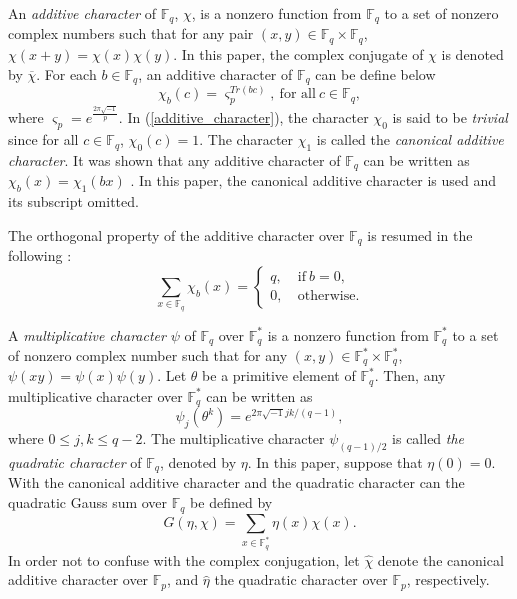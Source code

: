 \documentclass[final,1p,times]{elsarticle}
\begin{document}
   An \textit{additive character} of $ \mathbb{F}_{q} $, $ \chi $, is a nonzero function from $ \mathbb{F}_{q} $ to a set of nonzero complex numbers such that for any pair $ (x,y) \in \mathbb{F}_{q}\times \mathbb{F}_{q} $, $ \chi (x+y) =\chi(x)\chi(y)$. In this paper, the complex conjugate of $ \chi $ is denoted by $\overline{\chi} $. For each $ b\in \mathbb{F}_{q}$, an additive character of  $ \mathbb{F}_{q} $ can be define below
   \begin{equation}\label{additive_character}
   \chi_{b}(c)=\varsigma_{p}^{Tr(bc)},\ \text{for all}\ c\in \mathbb{F}_{q},
   \end{equation}
   where $ \varsigma_{p}=e^{\frac{2\pi\sqrt{-1}}{p}} $. In (\ref{additive_character}),  the  character $ \chi_{0} $ is said to be \textit{trivial} since for all $  c\in \mathbb{F}_{q} $, $ \chi_{0}(c) =1$. The character $ \chi_{1} $ is called the \textit{canonical additive character}. It was shown that  any additive character of 
  $ \mathbb{F}_{q} $ can be written as $ \chi_{b}(x)=\chi_{1}(bx) $ \cite[Chapter 5]{Bib15}. In this paper, the canonical additive character is used and its subscript omitted.
  
   The orthogonal property of the additive character over $ \mathbb{F}_{q} $ is resumed in the following \cite[Chapter 5]{Bib15}:
  \begin{equation*}
  \sum_{x\in \mathbb{F}_{q}}\chi_{b}(x)=
  \begin{cases}
  q,&\ \text{if}\ b=0,\\
  0,&\ \text{otherwise.}
  \end{cases}
  \end{equation*}
  
  A \textit{multiplicative character} $ \psi $ of $ \mathbb{F}_{q} $ over $ \mathbb{F}_{q}^{*} $ is a nonzero function from $ \mathbb{F}_{q}^{*} $ to  a set of nonzero complex number such that for any $ (x,y)\in \mathbb{F}_{q}^{*}\times\mathbb{F}_{q}^{*}$,  $ \psi(xy)=\psi(x)\psi(y) $. Let $ \theta $ be a primitive element of $ \mathbb{F}_{q}^{*} $. Then, any multiplicative character over $ \mathbb{F}_{q}^{*} $ can be written as 
  \begin{equation*}
  \psi_{j} (\theta^{k}) =e^{2\pi\sqrt{-1} jk/(q-1)},    
  \end{equation*}
  where $ 0\leq j,k\leq q-2 $. The multiplicative character $ \psi_{(q-1)/2} $ is called \textit{the quadratic character} of $ \mathbb{F}_{q} $, denoted by $ \eta $. In this paper, suppose that $ \eta(0)=0 $. 
  With the canonical additive character and the quadratic character can the quadratic Gauss sum over $ \mathbb{F}_{q} $ be defined by
  \begin{equation}\label{Gauss_sum_def}
  G(\eta,\chi)=\sum_{x\in \mathbb{F}_{q}^{*}}\eta(x)\chi(x).
  \end{equation}
  In order not to confuse with the complex conjugation, let $ \widehat{\chi} $ denote the canonical additive character over $ \mathbb{F}_{p} $, and $ \widehat{\eta} $ the quadratic character over $ \mathbb{F}_{p} $, respectively.
  
\end{document}
